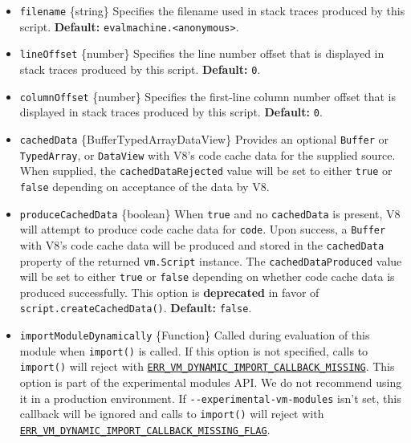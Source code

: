 \begin{itemize}
  \begin{itemize}
  \tightlist
  \item
    \texttt{filename} \{string\} Specifies the filename used in stack
    traces produced by this script. \textbf{Default:}
    \texttt{\textquotesingle{}evalmachine.\textless{}anonymous\textgreater{}\textquotesingle{}}.
  \item
    \texttt{lineOffset} \{number\} Specifies the line number offset that
    is displayed in stack traces produced by this script.
    \textbf{Default:} \texttt{0}.
  \item
    \texttt{columnOffset} \{number\} Specifies the first-line column
    number offset that is displayed in stack traces produced by this
    script. \textbf{Default:} \texttt{0}.
  \item
    \texttt{cachedData} \{Buffer\textbar TypedArray\textbar DataView\}
    Provides an optional \texttt{Buffer} or \texttt{TypedArray}, or
    \texttt{DataView} with V8's code cache data for the supplied source.
    When supplied, the \texttt{cachedDataRejected} value will be set to
    either \texttt{true} or \texttt{false} depending on acceptance of
    the data by V8.
  \item
    \texttt{produceCachedData} \{boolean\} When \texttt{true} and no
    \texttt{cachedData} is present, V8 will attempt to produce code
    cache data for \texttt{code}. Upon success, a \texttt{Buffer} with
    V8's code cache data will be produced and stored in the
    \texttt{cachedData} property of the returned \texttt{vm.Script}
    instance. The \texttt{cachedDataProduced} value will be set to
    either \texttt{true} or \texttt{false} depending on whether code
    cache data is produced successfully. This option is
    \textbf{deprecated} in favor of \texttt{script.createCachedData()}.
    \textbf{Default:} \texttt{false}.
  \item
    \texttt{importModuleDynamically} \{Function\} Called during
    evaluation of this module when \texttt{import()} is called. If this
    option is not specified, calls to \texttt{import()} will reject with
    \href{errors.md\#err_vm_dynamic_import_callback_missing}{\texttt{ERR\_VM\_DYNAMIC\_IMPORT\_CALLBACK\_MISSING}}.
    This option is part of the experimental modules API. We do not
    recommend using it in a production environment. If
    \texttt{-\/-experimental-vm-modules} isn't set, this callback will
    be ignored and calls to \texttt{import()} will reject with
    \href{errors.md\#err_vm_dynamic_import_callback_missing_flag}{\texttt{ERR\_VM\_DYNAMIC\_IMPORT\_CALLBACK\_MISSING\_FLAG}}.


\end{itemize}
\end{itemize}
